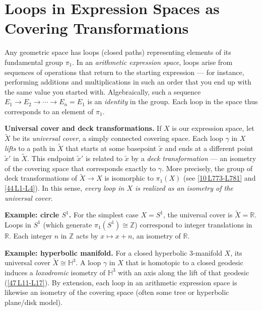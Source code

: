 \documentclass[11pt]{article}
\theoremstyle{remark}
\begin{document}
    \bigskip

    \section{Loops in Expression Spaces as Covering Transformations}
    \label{sec:loops-as-coverings}

    Any geometric space has loops (closed paths) representing elements of its fundamental group $\pi_1$. In an \emph{arithmetic expression space}, loops arise from sequences of operations that return to the starting expression --- for instance, performing additions and multiplications in such an order that you end up with the same value you started with. Algebraically, such a sequence $E_1 \to E_2 \to \cdots \to E_n = E_1$ is an \emph{identity} in the group. Each loop in the space thus corresponds to an element of $\pi_1$.

    \medskip

    {\bf Universal cover and deck transformations.} If $X$ is our expression space, let $\widetilde{X}$ be its \emph{universal cover}, a simply connected covering space. Each loop $\gamma$ in $X$ \emph{lifts} to a path in $\widetilde{X}$ that starts at some basepoint $\widetilde{x}$ and ends at a different point $\widetilde{x}'$ in $\widetilde{X}$. This endpoint $\widetilde{x}'$ is related to $\widetilde{x}$ by a \emph{deck transformation} --- an isometry of the covering space that corresponds exactly to $\gamma$. More precisely, the group of deck transformations of $\widetilde{X}\to X$ is isomorphic to $\pi_1(X)$ (see \href{http://homepages.math.uic.edu/~kauffman/KnotGroupAndBFTheory.pdf}{[10\,\textdagger L773-L781]} and \href{https://www.maths.ed.ac.uk/~v1ranick/papers/hatcher.pdf}{[44\,\textdagger L1-L4]}). In this sense, \emph{every loop in $X$ is realized as an isometry of the universal cover}.

    \medskip

    {\bf Example: circle $S^1$.} For the simplest case $X=S^1$, the universal cover is $\widetilde{X}=\mathbb{R}$. Loops in $S^1$ (which generate $\pi_1(S^1)\cong\mathbb{Z}$) correspond to integer translations in $\mathbb{R}$. Each integer $n$ in $\mathbb{Z}$ acts by $x\mapsto x+n$, an isometry of $\mathbb{R}$.

    \medskip

    {\bf Example: hyperbolic manifold.} For a closed hyperbolic 3-manifold $X$, its universal cover $\widetilde{X}\cong \mathbb{H}^3$. A loop $\gamma$ in $X$ that is homotopic to a closed geodesic induces a \emph{loxodromic} isometry of $\mathbb{H}^3$ with an axis along the lift of that geodesic (\href{https://arxiv.org/abs/math/0109125}{[47\,\textdagger L11-L17]}). By extension, each loop in an arithmetic expression space is likewise an isometry of the covering space (often some tree or hyperbolic plane/disk model).
\end{document}
